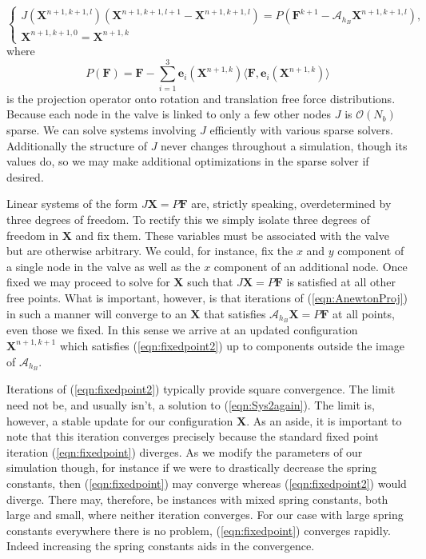\documentclass[preprint,12pt]{elsarticle}
\begin{document}
\begin{equation}
\left\{
\begin{gathered}
J(\mathbf{X}^{n+1,k+1,l})(\mathbf{X}^{n+1,k+1,l+1} - \mathbf{X}^{n+1,k+1,l}) = P(\mathbf{F}^{k+1} - \mathcal{A}_{h_B}\mathbf{X}^{n+1,k+1,l}),\\
\mathbf{X}^{n+1,k+1,0} = \mathbf{X}^{n+1,k}
\end{gathered}
\right.
\label{eqn:AnewtonProj}
\end{equation}
where
\begin{equation}
P(\mathbf{F}) = \mathbf{F} - \sum_{i=1}^3 \mathbf{e}_i(\mathbf{X}^{n+1,k})\langle\mathbf{F},\mathbf{e}_i(\mathbf{X}^{n+1,k})\rangle
\label{eqn:project}
\end{equation}
is the projection operator onto rotation and translation free force distributions. Because each node in the valve is linked to only a few other nodes $J$ is $\mathcal{O}(N_b)$ sparse. We can solve systems involving $J$ efficiently with various sparse solvers. Additionally the structure of $J$ never changes throughout a simulation, though its values do, so we may make additional optimizations in the sparse solver if desired.

Linear systems of the form $J\mathbf{X}=P\mathbf{F}$ are, strictly speaking, overdetermined by three degrees of freedom. To rectify this we simply isolate three degrees of freedom in $\mathbf{X}$ and fix them. These variables must be associated with the valve but are otherwise arbitrary. We could, for instance, fix the $x$ and $y$ component of a single node in the valve as well as the $x$ component of an additional node. Once fixed we may proceed to solve for $\mathbf{X}$ such that $J\mathbf{X}=P\mathbf{F}$ is satisfied at all other free points. What is important, however, is that iterations of (\ref{eqn:AnewtonProj}) in such a manner will converge to an $\mathbf{X}$ that satisfies $\mathcal{A}_{h_B}\mathbf{X}=P\mathbf{F}$ at all points, even those we fixed. In this sense we arrive at an updated configuration $\mathbf{X}^{n+1,k+1}$ which satisfies (\ref{eqn:fixedpoint2}) up to components outside the image of $\mathcal{A}_{h_B}$.

Iterations of (\ref{eqn:fixedpoint2}) typically provide square convergence. The limit need not be, and usually isn't, a solution to (\ref{eqn:Sys2again}). The limit is, however, a stable update for our configuration $\mathbf{X}$. As an aside, it is important to note that this iteration converges precisely because the standard fixed point iteration (\ref{eqn:fixedpoint}) diverges. As we modify the parameters of our simulation though, for instance if we were to drastically decrease the spring constants, then (\ref{eqn:fixedpoint}) may converge whereas (\ref{eqn:fixedpoint2}) would diverge. There may, therefore, be instances with mixed spring constants, both large and small, where neither iteration converges.
For our case with large spring constants everywhere there is no problem, (\ref{eqn:fixedpoint}) converges rapidly. Indeed increasing the spring constants aids in the convergence.
\end{document}

